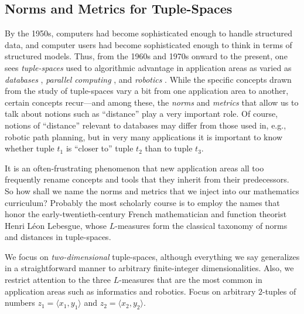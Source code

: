 \subsection{Norms and Metrics for Tuple-Spaces}
\label{sec:Ln-norms}


By the 1950s, computers had become sophisticated enough to handle structured data, and computer users had become sophisticated enough to think in terms of structured models.  Thus, from the 1960s and 1970s onward to the present, one sees {\it tuple-spaces} used to algorithmic advantage in application areas as varied as {\it databases} \cite{Codd70}, {\it parallel computing} \cite{BlumS77,Shinahr74}, and {\it robotics} \cite{Marchese96,Rosenberg12}.  While the specific concepts drawn from the study of tuple-spaces vary a bit from one application area to another, certain concepts recur---and among these, the {\it norms} and {\it metrics} that allow us to talk about notions such as ``distance'' play a very important role.  Of course, notions of ``distance''
relevant to databases may differ from those used in, e.g., robotic path planning, but in very many applications it is important to know whether tuple $t_1$ is ``closer to'' tuple $t_2$ than to tuple $t_3$.

\smallskip

 

It is an often-frustrating phenomenon that new application areas all too frequently rename concepts and tools that they inherit from their predecessors.  So how shall we name the norms and metrics that we inject into our mathematics curriculum?  Probably the most scholarly course is to employ the names that honor the early-twentieth-century French mathematician and function theorist Henri L\'{e}on Lebesgue, whose $L$-measures form the classical taxonomy of norms and distances in tuple-spaces.

\smallskip

We focus on {\em two-dimensional} tuple-spaces, although everything we say generalizes in a straightforward manner to arbitrary finite-integer dimensionalities.  Also, we restrict attention to the three $L$-measures that are the most common in application areas such as informatics and robotics.  Focus on arbitrary $2$-tuples of numbers $z_1 = \langle x_1, y_1 \rangle$ and $z_2 = \langle x_2, y_2 \rangle$.

\medskip

  
  

